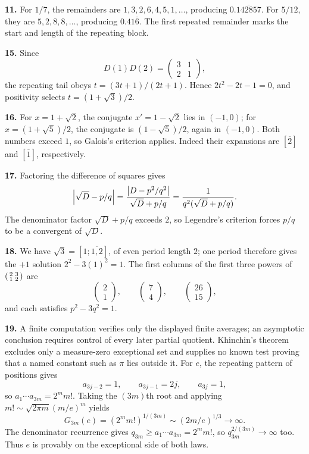 \textbf{11.} For $1/7$, the remainders are
$1,3,2,6,4,5,1,\dots$, producing $0.\overline{142857}$. For $5/12$, they are
$5,2,8,8,\dots$, producing $0.41\overline6$. The first repeated remainder
marks the start and length of the repeating block.

\textbf{15.} Since
\[
D(1)D(2)=\begin{pmatrix}3&1\\2&1\end{pmatrix},
\]
the repeating tail obeys $t=(3t+1)/(2t+1)$. Hence
$2t^2-2t-1=0$, and positivity selects $t=(1+\sqrt3)/2$.

\textbf{16.} For $x=1+\sqrt2$, the conjugate $x'=1-\sqrt2$ lies in
$(-1,0)$; for $x=(1+\sqrt5)/2$, the conjugate is $(1-\sqrt5)/2$, again in
$(-1,0)$. Both numbers exceed $1$, so Galois's criterion applies. Indeed their
expansions are $[\overline2]$ and $[\overline1]$, respectively.

\textbf{17.} Factoring the difference of squares gives
\[
 \left|\sqrt D-p/q\right|
 =\frac{\left|D-p^2/q^2\right|}{\sqrt D+p/q}
 =\frac{1}{q^2(\sqrt D+p/q)}.
\]
The denominator factor $\sqrt D+p/q$ exceeds $2$, so Legendre's criterion
forces $p/q$ to be a convergent of $\sqrt D$.

\textbf{18.} We have $\sqrt3=[1;\overline{1,2}]$, of even period length $2$;
one period therefore gives the $+1$ solution $2^2-3(1)^2=1$. The first columns
of the first three powers of
$\begin{psmallmatrix}2&3\\1&2\end{psmallmatrix}$ are
\[
 \begin{pmatrix}2\\1\end{pmatrix},\qquad
 \begin{pmatrix}7\\4\end{pmatrix},\qquad
 \begin{pmatrix}26\\15\end{pmatrix},
\]
and each satisfies $p^2-3q^2=1$.

\textbf{19.} A finite computation verifies only the displayed finite averages;
an asymptotic conclusion requires control of every later partial quotient.
Khinchin's theorem excludes only a measure-zero exceptional set and supplies no
known test proving that a named constant such as $\pi$ lies outside it. For $e$,
the repeating pattern of positions gives
\[
 a_{3j-2}=1,\qquad a_{3j-1}=2j,\qquad a_{3j}=1,
\]
so $a_1\cdots a_{3m}=2^m m!$. Taking the $(3m)$th root and applying
$m!\sim\sqrt{2\pi m}(m/e)^m$ yields
\[
 G_{3m}(e)=(2^m m!)^{1/(3m)}\sim(2m/e)^{1/3}\to\infty.
\]
The denominator recurrence gives
$q_{3m}\geq a_1\cdots a_{3m}=2^m m!$, so $q_{3m}^{2/(3m)}\to\infty$ too.
Thus $e$ is provably on the exceptional side of both laws.

